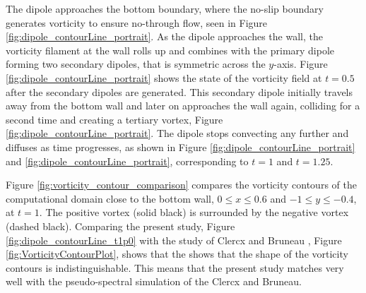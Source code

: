 The dipole approaches the bottom boundary, where the no-slip boundary generates vorticity to ensure no-through flow, seen in Figure \ref{fig:dipole_contourLine_portrait}{\color{darkblue}{b}}. As the dipole approaches the wall, the vorticity filament at the wall rolls up and combines with the primary dipole forming two secondary dipoles, that is symmetric across the $y$-axis. Figure \ref{fig:dipole_contourLine_portrait}{\color{darkblue}{c}} shows the state of the vorticity field at $t=0.5$ after the secondary dipoles are generated. This secondary dipole initially travels away from the bottom wall and later on approaches the wall again, colliding for a second time and creating a tertiary vortex, Figure \ref{fig:dipole_contourLine_portrait}{\color{darkblue}{d}}. The dipole stops convecting any further and diffuses as time progresses, as shown in Figure \ref{fig:dipole_contourLine_portrait}{\color{darkblue}{e}} and \ref{fig:dipole_contourLine_portrait}{\color{darkblue}{f}}, corresponding to $t = 1$ and $t = 1.25$.

Figure \ref{fig:vorticity_contour_comparison} compares the vorticity contours of the computational domain close to the bottom wall, $0\leqslant x \leqslant 0.6$ and $-1 \leqslant y \leqslant -0.4$, at $t = 1$. The positive vortex (solid black) is surrounded by the negative vortex (dashed black). Comparing the present study, Figure \ref{fig:dipole_contourLine_t1p0} with the study of Clercx and Bruneau \cite{Clercx2006a}, Figure \ref{fig:VorticityContourPlot}, shows that the shows that the shape of the vorticity contours is indistinguishable. This means that the present study matches very well with the pseudo-spectral simulation of the Clercx and Bruneau.

